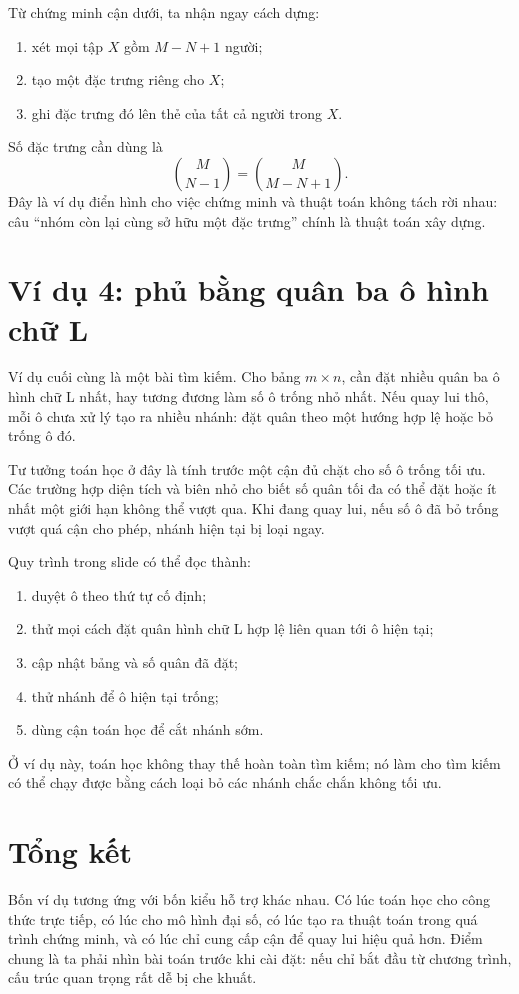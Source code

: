 \documentclass[11pt]{article}
\begin{document}
Từ chứng minh cận dưới, ta nhận ngay cách dựng:
\begin{enumerate}
  \item xét mọi tập \(X\) gồm \(M-N+1\) người;
  \item tạo một đặc trưng riêng cho \(X\);
  \item ghi đặc trưng đó lên thẻ của tất cả người trong \(X\).
\end{enumerate}
Số đặc trưng cần dùng là
\[
  \binom{M}{N-1}=\binom{M}{M-N+1}.
\]
Đây là ví dụ điển hình cho việc chứng minh và thuật toán không tách rời nhau:
câu ``nhóm còn lại cùng sở hữu một đặc trưng'' chính là thuật toán xây dựng.

\section{Ví dụ 4: phủ bằng quân ba ô hình chữ L}

Ví dụ cuối cùng là một bài tìm kiếm. Cho bảng \(m\times n\), cần đặt nhiều
quân ba ô hình chữ L nhất, hay tương đương làm số ô trống nhỏ nhất. Nếu quay
lui thô, mỗi ô chưa xử lý tạo ra nhiều nhánh: đặt quân theo một hướng hợp lệ
hoặc bỏ trống ô đó.

Tư tưởng toán học ở đây là tính trước một cận đủ chặt cho số ô trống tối ưu.
Các trường hợp diện tích và biên nhỏ cho biết số quân tối đa có thể đặt hoặc
ít nhất một giới hạn không thể vượt qua. Khi đang quay lui, nếu số ô đã bỏ
trống vượt quá cận cho phép, nhánh hiện tại bị loại ngay.

Quy trình trong slide có thể đọc thành:
\begin{enumerate}
  \item duyệt ô theo thứ tự cố định;
  \item thử mọi cách đặt quân hình chữ L hợp lệ liên quan tới ô hiện tại;
  \item cập nhật bảng và số quân đã đặt;
  \item thử nhánh để ô hiện tại trống;
  \item dùng cận toán học để cắt nhánh sớm.
\end{enumerate}
Ở ví dụ này, toán học không thay thế hoàn toàn tìm kiếm; nó làm cho tìm kiếm
có thể chạy được bằng cách loại bỏ các nhánh chắc chắn không tối ưu.

\section{Tổng kết}

Bốn ví dụ tương ứng với bốn kiểu hỗ trợ khác nhau. Có lúc toán học cho công
thức trực tiếp, có lúc cho mô hình đại số, có lúc tạo ra thuật toán trong quá
trình chứng minh, và có lúc chỉ cung cấp cận để quay lui hiệu quả hơn. Điểm
chung là ta phải nhìn bài toán trước khi cài đặt: nếu chỉ bắt đầu từ chương
trình, cấu trúc quan trọng rất dễ bị che khuất.
\end{document}
